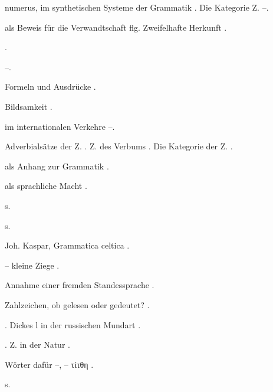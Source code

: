 \begin{register}
 numerus, im synthetischen Systeme der Grammatik \pageref{sp.101}. Die Kategorie  Z. \pageref{sp.445}–\pageref{sp.446}.

 als Beweis für die Verwandtschaft \pageref{sp.152} flg.  Zweifelhafte Herkunft \pageref{sp.384}.

 \pageref{sp.280}.

 \pageref{sp.310}–\pageref{sp.311}.



 Formeln und Ausdrücke \pageref{sp.107}.

 Bildsamkeit \pageref{sp.349}.

 im internationalen Verkehre \pageref{sp.17}–\pageref{sp.18}.

 Adverbialsätze der Z. \pageref{sp.104}. Z. des Verbums \pageref{sp.101}. Die Kategorie der Z. \pageref{sp.446}.

 als Anhang zur Grammatik \pageref{sp.107}.

 als sprachliche Macht \pageref{sp.126}.

 s. 

 s. 


 Joh. Kaspar, Grammatica celtica \pageref{sp.173}.

 – kleine Ziege \pageref{sp.324}.

 Annahme einer fremden Standessprache \pageref{sp.184}.

 Zahlzeichen, ob gelesen oder gedeutet? \pageref{sp.128}.

 \pageref{sp.54}. Dickes l in der russischen Mundart \pageref{sp.269}.


 \pageref{sp.36}.  Z. in der Natur \pageref{sp.314}.

 Wörter dafür \pageref{sp.153}–\pageref{sp.154}, – τίτθη \pageref{sp.208}.

 s. 


\end{register}
